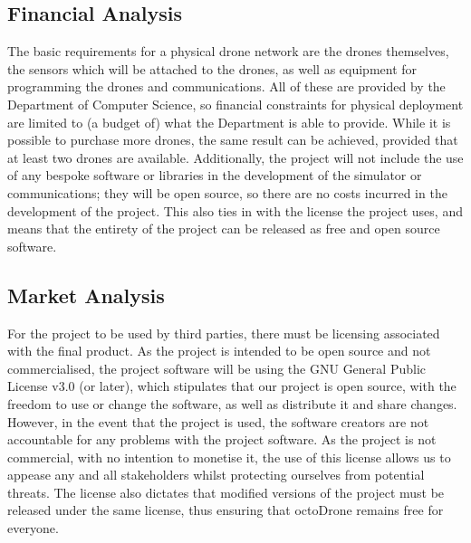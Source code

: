 \subsection{Financial Analysis}
The basic requirements for a physical drone network are the drones themselves, the sensors which will be attached to the drones, as well as equipment for programming the drones and communications. All of these are provided by the Department of Computer Science, so financial constraints for physical deployment are limited to (a budget of) what the Department is able to provide. While it is possible to purchase more drones, the same result can be achieved, provided that at least two drones are available. Additionally, the project will not include the use of any bespoke software or libraries in the development of the simulator or communications; they will be open source, so there are no costs incurred in the development of the project. This also ties in with the license the project uses, and means that the entirety of the project can be released as free and open source software.

\subsection{Market Analysis}
For the project to be used by third parties, there must be licensing associated with the final product. As the project is intended to be open source and not commercialised, the project software will be using the GNU General Public License v3.0 (or later), which stipulates that our project is open source, with the freedom to use or change the software, as well as distribute it and share changes. However, in the event that the project is used, the software creators are not accountable for any problems with the project software. As the project is not commercial, with no intention to monetise it, the use of this license allows us to appease any and all stakeholders whilst protecting ourselves from potential threats. The license also dictates that modified versions of the project must be released under the same license, thus ensuring that octoDrone remains free for everyone.

